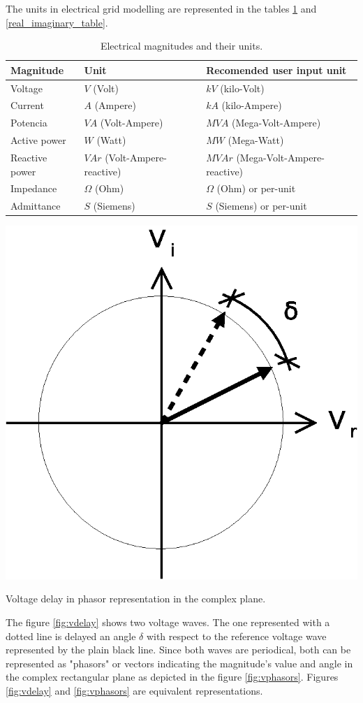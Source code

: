 \documentclass{tufte-book}
\begin{document}
The units in electrical grid modelling are represented in the tables \ref{units_table} and \ref{real_imaginary_table}.


\begin{table}[h]
\begin{center}
\footnotesize
\begin{tabular}{lll}
\toprule
Magnitude & Unit & Recomended user input unit\\
\midrule
Voltage & $V$ (Volt) & $kV$ (kilo-Volt)\\
Current & $A$ (Ampere) & $kA$ (kilo-Ampere)\\
Potencia & $VA$ (Volt-Ampere) & $MVA$ (Mega-Volt-Ampere)\\
Active power & $W$ (Watt) & $MW$ (Mega-Watt)\\
Reactive power & $VAr$ (Volt-Ampere-reactive) & $MVAr$ (Mega-Volt-Ampere-reactive)\\
Impedance & $\Omega$ (Ohm) & $\Omega$ (Ohm) or per-unit\\
Admittance & $S$ (Siemens) &  $S$ (Siemens) or per-unit\\
\bottomrule
\end{tabular}
\end{center}
  \caption{Electrical magnitudes and their units.}
  \label{units_table}
\end{table}


\begin{marginfigure}
  \includegraphics[width=0.5\linewidth]{img/VoltagePhasors.eps}
  \caption{Voltage delay in phasor representation in the complex plane.}
  \label{fig:vphasors}
\end{marginfigure}


The figure \ref{fig:vdelay} shows two voltage waves. The one represented with a dotted line is delayed an angle $\delta$ with respect to the reference voltage wave represented by the plain black line. Since both waves are periodical, both can be represented as "phasors" or vectors indicating the magnitude's value and angle in the complex rectangular plane as depicted in the figure \ref{fig:vphasors}. Figures \ref{fig:vdelay} and \ref{fig:vphasors} are equivalent representations.
\end{document}
